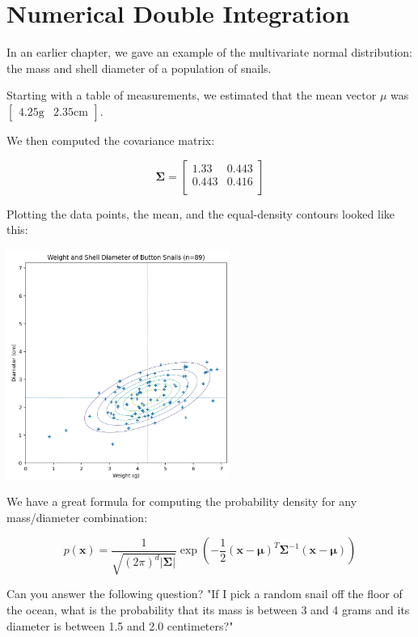 \chapter{Numerical Double Integration}

In an earlier chapter, we gave an example of the multivariate normal distribution: the mass and shell diameter of a population of snails.

Starting with a table of measurements, we estimated that the mean vector $\mu$ was $\begin{bmatrix}4.25 \text{g} & 2.35 \text{cm}\end{bmatrix}$.

We then computed the covariance matrix:

\begin{equation*}
\mathbf{\Sigma} = \begin{bmatrix}
1.33 &  0.443 \\
0.443 & 0.416 \\
\end{bmatrix}
\end{equation*}

Plotting the data points, the mean, and the equal-density contours looked like this:

\includegraphics[width=0.55\textwidth]{contour.png}

We have a great formula for computing the probability density for any mass/diameter combination:

\begin{equation*}
p(\mathbf{x}) = \frac{1}{\sqrt{(2\pi)^d|\mathbf{\Sigma}|}}\exp\left(-\frac{1}{2}(\mathbf{x}-\boldsymbol\mu)^T\mathbf{\Sigma}^{-1}(\mathbf{x}-\boldsymbol\mu)\right)
\end{equation*}

Can you answer the following question? "If I pick a random snail off the floor of the ocean, what is the probability that its mass is between 3 and 4 grams
and its diameter is between 1.5 and 2.0 centimeters?"

